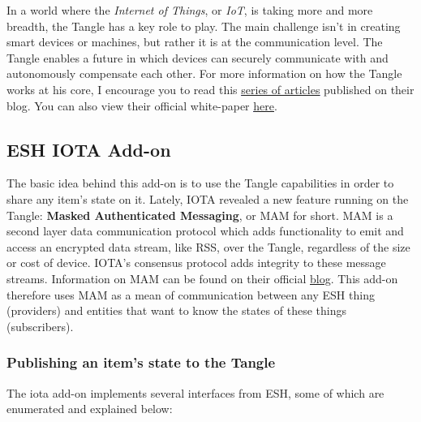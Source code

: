 \documentclass[a4paper,10pt]{article}
\begin{document}
\noindent In a world where the \textit{Internet of Things}, or \textit{IoT}, is taking more and more breadth, the Tangle has a key role to play. The main challenge isn’t in creating smart devices or machines, but rather it is at the communication level. The Tangle enables a future in which devices can securely communicate with and autonomously compensate each other. For more information on how the Tangle works at his core, I encourage you to read this \textcolor{blue}{\underline{\href{https://blog.iota.org/the-tangle-an-illustrated-introduction-4d5eae6fe8d4}{series of articles}}} published on their blog. You can also view their official white-paper \textcolor{blue}{\underline{\href{http://iotatoken.com/IOTA_Whitepaper.pdf}{here}}}. 

\subsection{ESH IOTA Add-on}

The basic idea behind this add-on is to use the Tangle capabilities in order to share any item's state on it. Lately, IOTA revealed a new feature running on the Tangle: \textbf{Masked Authenticated Messaging}, or MAM for short. MAM is a second layer data communication protocol which adds functionality to emit and access an encrypted data stream, like RSS, over the Tangle, regardless of the size or cost of device. IOTA’s consensus protocol adds integrity to these message streams. Information on MAM can be found on their official \textcolor{blue}{\underline{\href{https://blog.iota.org/introducing-masked-authenticated-messaging-e55c1822d50e}{blog}}}. This add-on therefore uses MAM as a mean of communication between any ESH thing (providers) and entities that want to know the states of these things (subscribers). 

\subsubsection{Publishing an item's state to the Tangle}

The iota add-on implements several interfaces from ESH, some of which are enumerated and explained below:
\end{document}
